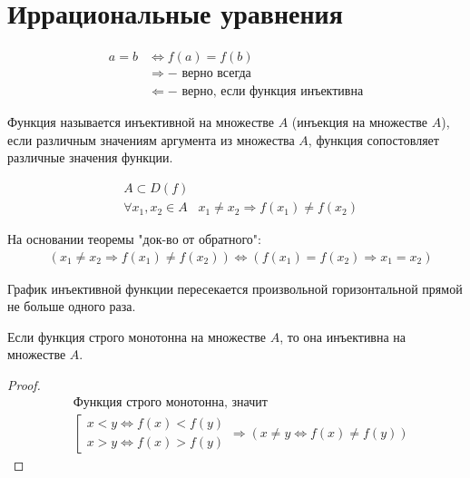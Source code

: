 \section{Иррациональные уравнения}

\begin{align*}
    a = b &\iff f(a) = f(b) \\
    &\Rightarrow - \text{ верно всегда}\\
    &\Leftarrow - \text{ верно, если функция инъективна}
\end{align*}

\begin{definition}[Инъективность]
    Функция называется инъективной на множестве $A$ (инъекция на множестве $A$), если различным значениям аргумента из множества $A$, 
    функция сопостовляет различные значения функции.

    \begin{align*}
        &A \subset D(f) \\
        &\forall x_1, x_2 \in A \;\;\; x_1 \neq x_2 \Rightarrow f(x_1) \neq f(x_2)
    \end{align*}
\end{definition}

\begin{remark}
    На основании теоремы "док-во от обратного":
    \begin{align*}
        &(x_1 \neq x_2 \Rightarrow f(x_1) \neq f(x_2)) \iff (f(x_1) = f(x_2) \Rightarrow x_1 = x_2)
    \end{align*}
\end{remark}

\hfill \newline

\begin{remark}
    График инъективной функции пересекается произвольной горизонтальной прямой не больше одного раза.
\end{remark}

\begin{theorem}
    Если функция строго монотонна на множестве $A$, то она инъективна на множестве $A$.
\end{theorem}

\begin{proof}
    \begin{align*}
        &\text{Функция строго монотонна, значит } \\
        &\left[\begin{array}{l}
            x < y \iff f(x) < f(y) \\
            x > y \iff f(x) > f(y) 
        \end{array}\right. \Rightarrow
        (x \neq y \iff f(x) \neq f(y))
    \end{align*}
\end{proof}

